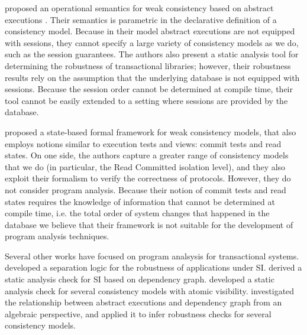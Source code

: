 \citeauthor{sureshConcur} proposed an operational semantics for weak consistency 
based on abstract executions \cite{sureshConcur}. Their semantics 
is parametric in the declarative definition of a consistency model. Because 
in their model abstract executions are not equipped with sessions, they cannot 
specify a large variety of consistency models as we do, such as the session guarantees. 
The authors also present a static analysis tool for determining the robustness of transactional 
libraries; however, their robustness results rely on the assumption that the underlying database 
is not equipped with sessions. Because the session order cannot be determined at compile time, 
their tool cannot be easily extended to a setting where sessions are provided by the database. 

\citeauthor{seebelieve} \cite{seebelieve} proposed a state-based formal framework for weak consistency models, 
that also employs notions similar to execution tests and views: commit tests and read states.
On one side, the authors capture 
a greater range of consistency models that we do (in particular, the Read Committed isolation level), 
and they also exploit their formalism to verify the correctness of protocols.
However, they do not consider program analysis. Because their notion of commit tests and read states requires 
the knowledge of information that cannot be determined at compile time, i.e. the total order of system changes that happened in the database 
we believe that their framework is not suitable for the development of program analysis techniques.

Several other works have focused on program analsysis for transactional systems. 
\citeauthor{dias-tm} \cite{dias-tm} developed a separation logic for
the robustness of applications under SI. \citeauthor{fekete-tods} \cite{fekete-tods} derived 
a static analysis check for SI based on dependency graph. \citeauthor{giovanni_concur16} \cite{giovanni_concur16} 
developed a static analysis check for several consistency models with atomic visibility. 
\citeauthor{laws} \cite{laws} investigated the relationship between abstract 
executions and dependency graph from an algebraic perspective, and applied it to infer 
robustness checks for several consistency models. 

